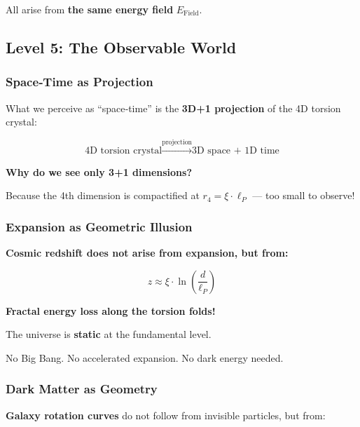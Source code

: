 	All arise from \textbf{the same energy field} $E_{\text{Field}}$.
	
	\subsection{Level 5: The Observable World}
	
	\subsubsection{Space‑Time as Projection}
	
	What we perceive as \enquote{space‑time} is the \textbf{3D+1 projection} of the 4D torsion crystal:
	
	\begin{equation}
		\text{4D torsion crystal} \xrightarrow{\text{projection}} \text{3D space + 1D time}
	\end{equation}
	
	\textbf{Why do we see only 3+1 dimensions?}
	
	Because the 4th dimension is compactified at $r_4 = \xi \cdot \ell_P$ — too small to observe!
	
	\subsubsection{Expansion as Geometric Illusion}
	
	\begin{keyresult}
		\textbf{Cosmic redshift does not arise from expansion, but from:}
		
		\begin{equation}
			\boxed{z \approx \xi \cdot \ln\left(\frac{d}{\ell_P}\right)}
		\end{equation}
		
		\textbf{Fractal energy loss along the torsion folds!}
		
		\vspace{0.3cm}
		
		The universe is \textbf{static} at the fundamental level.
		
		No Big Bang. No accelerated expansion. No dark energy needed.
	\end{keyresult}
	
	\subsubsection{Dark Matter as Geometry}
	
	\textbf{Galaxy rotation curves} do not follow from invisible particles, but from:
	

